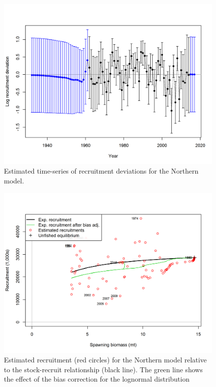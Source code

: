 \documentclass[12pt,]{article}
\begin{document}
\FloatBarrier

\begin{figure}[htbp]
\centering
\includegraphics{r4ss/plots_mod1/recdevs2_withbars.png}
\caption{Estimated time-series of recruitment deviations for the
Northern model. \label{fig:recdevs1.N}}
\end{figure}

\FloatBarrier

\begin{figure}[htbp]
\centering
\includegraphics{r4ss/plots_mod1/SR_curve2.png}
\caption{Estimated recruitment (red circles) for the Northern model
relative to the stock-recruit relationship (black line). The green line
shows the effect of the bias correction for the lognormal distribution
\label{fig:stock_recruit_curve.N}}
\end{figure}
\end{document}
